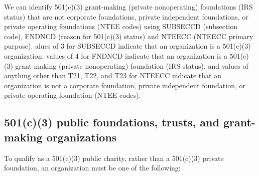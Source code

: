 \documentclass[
  letterpaper,
  DIV=11,
  numbers=noendperiod,
  oneside]{scrreprt}
\begin{document}
We can identify 501(c)(3) grant-making (private nonoperating)
foundations (IRS status) that are not corporate foundations, private
independent foundations, or private operating foundations (NTEE codes)
using SUBSECCD (subsection code), FNDNCD (reason for 501(c)(3) status)
and NTEECC (NTEECC primary purpose). alues of 3 for SUBSECCD indicate
that an organization is a 501(c)(3) organization; values of 4 for FNDNCD
indicate that an organization is a 501(c)(3) grant-making (private
nonoperating) foundation (IRS status), and values of anything other than
T21, T22, and T23 for NTEECC indicate that an organization is not a
corporate foundation, private independent foundation, or private
operating foundation (NTEE codes).

\hypertarget{c3-public-foundations-trusts-and-grant-making-organizations}{%
\subsection{501(c)(3) public foundations, trusts, and grant-making
organizations}\label{c3-public-foundations-trusts-and-grant-making-organizations}}

To qualify as a 501(c)(3) public charity, rather than a 501(c)(3)
private foundation, an organization must be one of the following:
\end{document}
